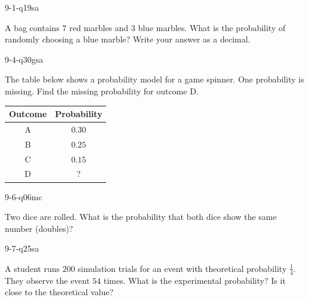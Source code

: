 \begin{practiceQuestion}{9-1-q19}{sa}
\begin{questionText}
A bag contains $7$ red marbles and $3$ blue marbles. What is the probability of randomly choosing a blue marble? Write your answer as a decimal.
\end{questionText}
\end{practiceQuestion}

\begin{practiceQuestion}{9-4-q30}{gsa}
\begin{questionText}
The table below shows a probability model for a game spinner. One probability is missing. Find the missing probability for outcome D.

\begin{center}
\begin{tabular}{|c|c|}
\hline
\textbf{Outcome} & \textbf{Probability} \\
\hline
A & $0.30$ \\
\hline
B & $0.25$ \\
\hline
C & $0.15$ \\
\hline
D & ? \\
\hline
\end{tabular}
\end{center}
\end{questionText}
\end{practiceQuestion}

\begin{practiceQuestion}{9-6-q06}{mc}
\begin{questionText}
Two dice are rolled. What is the probability that both dice show the same number (doubles)?
\end{questionText}
\end{practiceQuestion}

\begin{practiceQuestion}{9-7-q25}{sa}
\begin{questionText}
A student runs $200$ simulation trials for an event with theoretical probability $\frac{1}{4}$. They observe the event $54$ times. What is the experimental probability? Is it close to the theoretical value?
\end{questionText}
\end{practiceQuestion}
